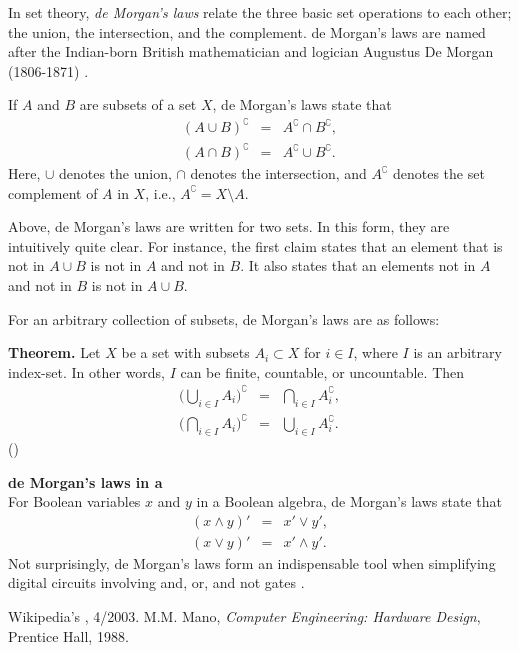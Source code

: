 \documentclass{article}
\begin{document}
In set theory, \emph{de Morgan's laws}
relate the three basic set operations to each other; 
the union, the intersection, and the complement. 
de Morgan's laws are named after the 
Indian-born British mathematician and logician
Augustus De Morgan (1806-1871) \cite{wikidemorgan}.


If $A$ and $B$  are subsets of a set $X$, de Morgan's laws state that 
\begin{eqnarray*}
(A \cup B)^\complement &=& A^\complement \cap B^\complement, \\ 
(A \cap B)^\complement &=& A^\complement \cup B^\complement.
\end{eqnarray*}
Here, $\cup$ denotes the union, $\cap$ denotes the intersection, 
and $A^\complement$ denotes the set complement of $A$ in $X$, i.e., 
$A^\complement= X\setminus A$.

Above, de Morgan's laws are written for two sets. 
In this form, they are intuitively quite clear. 
For instance, the first claim states  that an element
that is not in $A\cup B$ is not in $A$
and not in $B$. It also states that an elements not in $A$
and not in $B$ is not in  $A\cup B$. 

For an arbitrary collection of subsets, de Morgan's laws are
as follows:

{\bf Theorem.}
 Let $X$ be a set with subsets $A_i \subset X$ for $i\in I$, where
 $I$ is an arbitrary index-set. In other words, $I$ can be finite,
 countable, or uncountable. Then
 \begin{eqnarray*}
 \Big( \bigcup_{i\in I} A_i \Big)^\complement &=& \bigcap_{i\in I} A_i^\complement, \\
 \Big( \bigcap_{i\in I} A_i \Big)^\complement &=& \bigcup_{i\in I} A_i^\complement.
 \end{eqnarray*}
()

{\bf de Morgan's laws in a  }\\
For Boolean variables $x$ and $y$ in a Boolean algebra, 
de Morgan's laws state that
\begin{eqnarray*}
(x \land y)' &=& x' \lor y', \\
(x \lor y)' &=& x' \land y'.
\end{eqnarray*}
Not surprisingly, de Morgan's laws form an indispensable tool
when simplifying digital circuits involving and, or, and not
gates \cite{mano}. 

\begin{thebibliography}{9}
Wikipedia's , 4/2003.
M.M. Mano, 
\emph{Computer Engineering: Hardware Design},
Prentice Hall, 1988.
\end{thebibliography}
\end{document}

